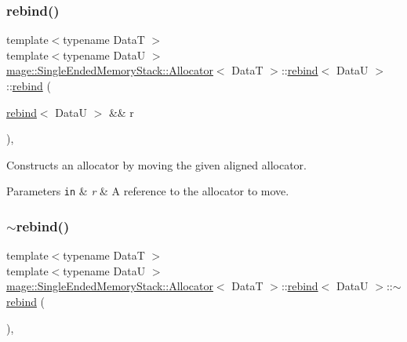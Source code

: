 \subsubsection{\texorpdfstring{rebind()}{rebind()}\hspace{0.1cm}{\footnotesize\ttfamily [3/3]}}
{\footnotesize\ttfamily template$<$typename DataT $>$ \\
template$<$typename DataU $>$ \\
\hyperlink{structmage_1_1_single_ended_memory_stack_1_1_allocator}{mage\+::\+Single\+Ended\+Memory\+Stack\+::\+Allocator}$<$ DataT $>$\+::\hyperlink{structmage_1_1_single_ended_memory_stack_1_1_allocator_1_1rebind}{rebind}$<$ DataU $>$\+::\hyperlink{structmage_1_1_single_ended_memory_stack_1_1_allocator_1_1rebind}{rebind} (\begin{DoxyParamCaption}\item[{\hyperlink{structmage_1_1_single_ended_memory_stack_1_1_allocator_1_1rebind}{rebind}$<$ DataU $>$ \&\&}]{r }\end{DoxyParamCaption})\hspace{0.3cm}{\ttfamily [private]}, {\ttfamily [delete]}}

Constructs an allocator by moving the given aligned allocator.


\begin{DoxyParams}[1]{Parameters}
\mbox{\tt in}  & {\em r} & A reference to the allocator to move. \\
\hline
\end{DoxyParams}
\hypertarget{structmage_1_1_single_ended_memory_stack_1_1_allocator_1_1rebind_ac5560de51fdd40828b0b82f7975199d1}{}\label{structmage_1_1_single_ended_memory_stack_1_1_allocator_1_1rebind_ac5560de51fdd40828b0b82f7975199d1} 
\subsubsection{\texorpdfstring{$\sim$rebind()}{~rebind()}}
{\footnotesize\ttfamily template$<$typename DataT $>$ \\
template$<$typename DataU $>$ \\
\hyperlink{structmage_1_1_single_ended_memory_stack_1_1_allocator}{mage\+::\+Single\+Ended\+Memory\+Stack\+::\+Allocator}$<$ DataT $>$\+::\hyperlink{structmage_1_1_single_ended_memory_stack_1_1_allocator_1_1rebind}{rebind}$<$ DataU $>$\+::$\sim$\hyperlink{structmage_1_1_single_ended_memory_stack_1_1_allocator_1_1rebind}{rebind} (\begin{DoxyParamCaption}{ }\end{DoxyParamCaption})\hspace{0.3cm}{\ttfamily [private]}, {\ttfamily [delete]}}

